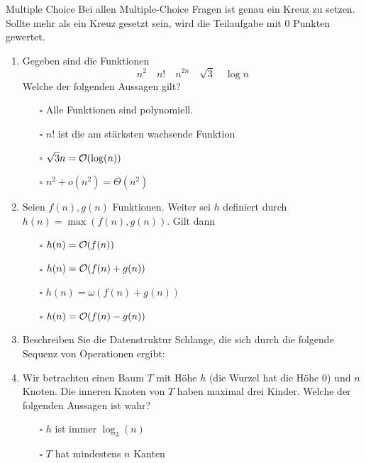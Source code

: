 \documentclass{article}
\begin{document}

\begin{exercise}{Multiple Choice}
  Bei allen Multiple-Choice Fragen ist genau ein Kreuz zu setzen. Sollte mehr als ein Kreuz gesetzt sein, wird die Teilaufgabe mit 0 Punkten gewertet.
  \begin{enumerate}
    \item Gegeben sind die Funktionen \[
            n^2 \quad n! \quad n^{2n} \quad \sqrt{3} \quad \log n
          \] Welche der folgenden Aussagen gilt?
          \begin{itemize}
            \item[$\square$] Alle Funktionen sind polynomiell.
            \item[$\square$] $n!$ ist die am stärksten wachsende Funktion
            \item[$\square$] $\sqrt{3} n = \mathcal{O}(\log(n))$
            \item[$\square$] $n^2 + o(n^2) = \Theta(n^2)$
          \end{itemize}
    \item Seien $f(n), g(n)$ Funktionen. Weiter sei $h$ definiert durch $h(n) = \max(f(n), g(n))$. Gilt dann
          \begin{itemize}
            \item[$\square$] $h(n) = \mathcal{O}(f(n))$
            \item[$\square$] $h(n) = \mathcal{O}(f(n) + g(n))$
            \item[$\square$] $h(n) = \omega(f(n) + g(n))$
            \item[$\square$] $h(n) = \mathcal{O}(f(n) - g(n))$
          \end{itemize}
    \item Beschreiben Sie die Datenstruktur Schlange, die sich durch die folgende Sequenz von Operationen ergibt:\par
          \begin{quote}\end{quote}
    \item Wir betrachten einen Baum $T$ mit Höhe $h$ (die Wurzel hat die Höhe 0) und $n$ Knoten. Die inneren Knoten von $T$ haben maximal drei Kinder. Welche der folgenden Aussagen ist wahr?
          \begin{itemize}
            \item[$\square$] $h$ ist immer $\log_3(n)$
            \item[$\square$] $T$ hat mindestens $n$ Kanten

\end{itemize}
\end{enumerate}
\end{exercise}
\end{document}
